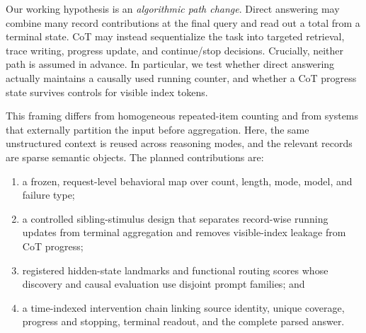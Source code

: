 \documentclass[10pt,twocolumn]{article}
\begin{document}
Our working hypothesis is an \emph{algorithmic path change}. Direct answering may combine many
record contributions at the final query and read out a total from a terminal state. CoT may
instead sequentialize the task into targeted retrieval, trace writing, progress update, and
continue/stop decisions. Crucially, neither path is assumed in advance. In particular, we test
whether direct answering actually maintains a causally used running counter, and whether a
CoT progress state survives controls for visible index tokens.

This framing differs from homogeneous repeated-item counting and from systems that externally
partition the input before aggregation. Here, the same unstructured context is reused across
reasoning modes, and the relevant records are sparse semantic objects. The planned contributions
are:
\begin{enumerate}
  \item a frozen, request-level behavioral map over count, length, mode, model, and failure type;
  \item a controlled sibling-stimulus design that separates record-wise running updates from
  terminal aggregation and removes visible-index leakage from CoT progress;
  \item registered hidden-state landmarks and functional routing scores whose discovery and
  causal evaluation use disjoint prompt families; and
  \item a time-indexed intervention chain linking source identity, unique coverage, progress and
  stopping, terminal readout, and the complete parsed answer.
\end{enumerate}
\end{document}

